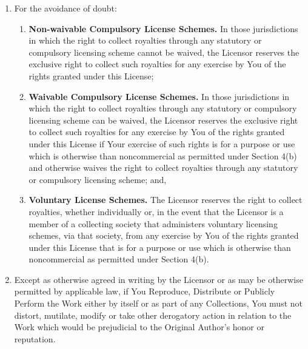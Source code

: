 \begin{enumerate}
\begin{enumerate}
            \item For the avoidance of doubt:

                \begin{enumerate}

                    \item \textbf{Non-waivable Compulsory License Schemes.} In
                        those jurisdictions in which the right to collect
                        royalties through any statutory or compulsory licensing
                        scheme cannot be waived, the Licensor reserves the
                        exclusive right to collect such royalties for any
                        exercise by You of the rights granted under this
                        License;
                    
                    \item \textbf{Waivable Compulsory License Schemes.} In
                        those jurisdictions in which the right to collect
                        royalties through any statutory or compulsory licensing
                        scheme can be waived, the Licensor reserves the
                        exclusive right to collect such royalties for any
                        exercise by You of the rights granted under this
                        License if Your exercise of such rights is for a
                        purpose or use which is otherwise than noncommercial as
                        permitted under Section 4(b) and otherwise waives the
                        right to collect royalties through any statutory or
                        compulsory licensing scheme; and,

                    \item \textbf{Voluntary License Schemes.} The Licensor
                        reserves the right to collect royalties, whether
                        individually or, in the event that the Licensor is a
                        member of a collecting society that administers
                        voluntary licensing schemes, via that society, from any
                        exercise by You of the rights granted under this
                        License that is for a purpose or use which is otherwise
                        than noncommercial as permitted under Section 4(b).
                        
                \end{enumerate}

            \item Except as otherwise agreed in writing by the Licensor or as
                may be otherwise permitted by applicable law, if You Reproduce,
                Distribute or Publicly Perform the Work either by itself or as
                part of any Collections, You must not distort, mutilate, modify
                or take other derogatory action in relation to the Work which
                would be prejudicial to the Original Author's honor or
                reputation.


\end{enumerate}
\end{enumerate}
